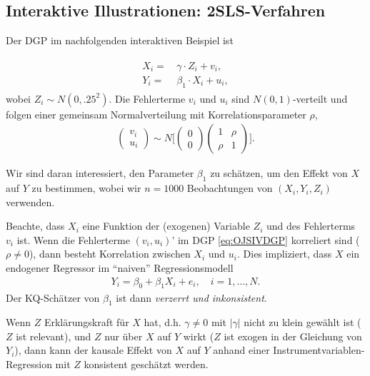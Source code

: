 \documentclass[
  a4paper,
  DIV=11,
  oneside]{scrreprt}
\begin{document}
\subsection{Interaktive Illustrationen:
2SLS-Verfahren}\label{interaktive-illustrationen-2sls-verfahren}

Der DGP im nachfolgenden interaktiven Beispiel ist

\begin{align}
  \begin{split}
    X_i =&\, \gamma \cdot Z_i + v_i,\\
    Y_i =&\, \beta_1 \cdot X_i + u_i,
  \end{split}
  \label{eq:OJSIVDGP}
\end{align} wobei \(Z_i \sim N(0, .25^2)\). Die Fehlerterme \(v_i\) und
\(u_i\) sind \(N(0,1)\)-verteilt und folgen einer gemeinsam
Normalverteilung mit Korrelationsparameter \(\rho\), \begin{align}
\begin{pmatrix}
v_i \\ u_i
\end{pmatrix}
\sim N
\bigg[
\begin{pmatrix}
0 \\ 0
\end{pmatrix}
\begin{pmatrix}
1 & \rho \\
\rho & 1
\end{pmatrix}
\bigg].
\end{align}

Wir sind daran interessiert, den Parameter \(\beta_1\) zu schätzen, um
den Effekt von \(X\) auf \(Y\) zu bestimmen, wobei wir \(n=1000\)
Beobachtungen von \((X_i, Y_i, Z_i)\) verwenden.

Beachte, dass \(X_i\) eine Funktion der (exogenen) Variable \(Z_i\) und
des Fehlerterms \(v_i\) ist. Wenn die Fehlerterme \((v_i, u_i)’\) im DGP
\eqref{eq:OJSIVDGP} korreliert sind (\(\rho\neq0\)), dann besteht
Korrelation zwischen \(X_i\) und \(u_i\). Dies impliziert, dass \(X\)
ein endogener Regressor im ``naiven'' Regressionsmodell \begin{align}
Y_i = \beta_0 + \beta_1 X_i + e_i, \quad i = 1,\dots,N.
\end{align} Der KQ-Schätzer von \(\beta_1\) ist dann \emph{verzerrt und
inkonsistent}.

Wenn \(Z\) Erklärungskraft für \(X\) hat, d.h. \(\gamma\neq0\) mit
\(|\gamma|\) nicht zu klein gewählt ist (\(Z\) ist relevant), und \(Z\)
nur über \(X\) auf \(Y\) wirkt (\(Z\) ist exogen in der Gleichung von
\(Y_i\)), dann kann der kausale Effekt von \(X\) auf \(Y\) anhand einer
Instrumentvariablen-Regression mit \(Z\) konsistent geschätzt werden.
\end{document}
